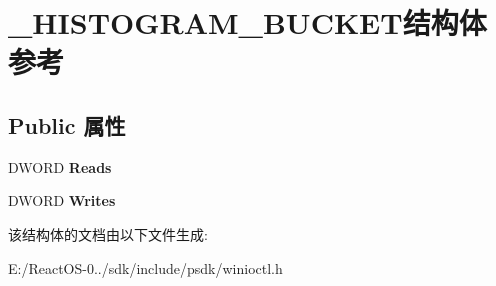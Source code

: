\hypertarget{struct___h_i_s_t_o_g_r_a_m___b_u_c_k_e_t}{}\section{\+\_\+\+H\+I\+S\+T\+O\+G\+R\+A\+M\+\_\+\+B\+U\+C\+K\+E\+T结构体 参考}
\label{struct___h_i_s_t_o_g_r_a_m___b_u_c_k_e_t}
\subsection*{Public 属性}
\begin{DoxyCompactItemize}
\item 
\mbox{\label{struct___h_i_s_t_o_g_r_a_m___b_u_c_k_e_t_ad7617be49face389c68c2e9906a921dd}} 
D\+W\+O\+RD {\bfseries Reads}
\item 
\mbox{\label{struct___h_i_s_t_o_g_r_a_m___b_u_c_k_e_t_abe4936ed80ce454208713223fa295685}} 
D\+W\+O\+RD {\bfseries Writes}
\end{DoxyCompactItemize}


该结构体的文档由以下文件生成\+:\begin{DoxyCompactItemize}
\item 
E\+:/\+React\+O\+S-\/0../sdk/include/psdk/winioctl.\+h\end{DoxyCompactItemize}
